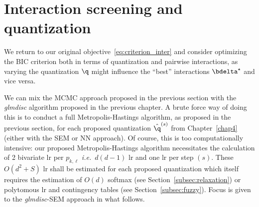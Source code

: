 \section{Interaction screening and quantization}

We return to our original objective~\eqref{eq:criterion_inter} and consider optimizing the BIC criterion both in terms of quantization and pairwise interactions, as varying the quantization $\q$ might influence the ``best'' interactions $\bdelta^\star$ and vice versa.

We can mix the MCMC approach proposed in the previous section with the \textit{glmdisc} algorithm proposed in the previous chapter. A brute force way of doing this is to conduct a full Metropolis-Hastings algorithm, as proposed in the previous section, for each proposed quantization $\hat{\q}^{(s)}$ from Chapter~\ref{chap4} (either with the SEM or NN approach). Of course, this is too computationally intensive: our proposed Metropolis-Hastings algorithm necessitates the calculation of 2 bivariate \gls{lr} per $p_{k,\ell}$ \textit{i.e.}\ $d(d-1)$ \gls{lr} and one \gls{lr} per step $(s)$. These $O(d^2 + S)$ \gls{lr} shall be estimated for each proposed quantization which itself requires the estimation of $O(d)$ softmax (see Section~\ref{subsec:relaxation}) or polytomous \gls{lr} and contingency tables (see Section~\ref{subsec:fuzzy}). Focus is given to the \textit{glmdisc}-SEM approach in what follows.

